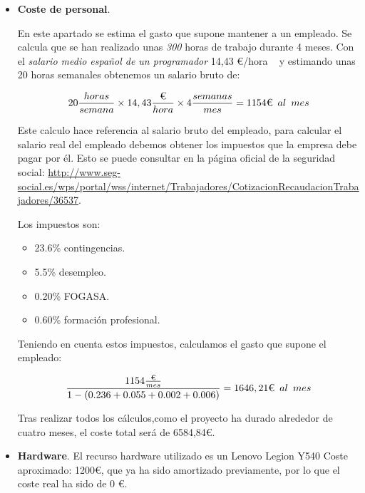\begin{itemize}
	\item \textbf{Coste de personal}.
	
	En este apartado se estima el gasto que supone mantener a un empleado. Se calcula que se han realizado unas \emph{300} horas de trabajo durante 4 meses. 
	Con el \textit{salario medio español de un programador} 14,43 €/hora ~\cite{SalarioProgramador} y estimando unas 20 horas semanales obtenemos un salario bruto de:
	

$$ 20\frac{horas}{semana}\times14,43\frac{\text{€}}{hora}\times4\frac{semanas}{mes}=1154\text{€}\hspace{0.5em}al\hspace{0.5em}mes  $$

Este calculo hace referencia al salario bruto del empleado, para calcular el salario real del empleado debemos  obtener los impuestos que la empresa debe pagar por él. Esto se puede consultar en la página oficial de la seguridad social: \url{http://www.seg-social.es/wps/portal/wss/internet/Trabajadores/CotizacionRecaudacionTrabajadores/36537}.

Los impuestos son:
\begin{itemize}
	\tightlist
	\item 23.6\% contingencias.
	\item 5.5\% desempleo.
	\item 0.20\% FOGASA.
	\item 0.60\% formación profesional.
\end{itemize}



Teniendo en cuenta estos impuestos, calculamos el gasto que supone el empleado:

$$\frac{1154\frac{\text{€}}{mes}}{1-(0.236+0.055+0.002+0.006)}=1646,21\text{€}\hspace{0.5em}al\hspace{0.5em}mes$$

Tras realizar todos los cálculos,como el proyecto ha durado alrededor de cuatro meses, el coste total será de 6584,84€.

\item \textbf{Hardware}.
El recurso hardware utilizado es un Lenovo Legion Y540 Coste aproximado: 1200€, que ya ha sido amortizado previamente, por lo que el coste real ha sido de 0 €.
 

\end{itemize}
